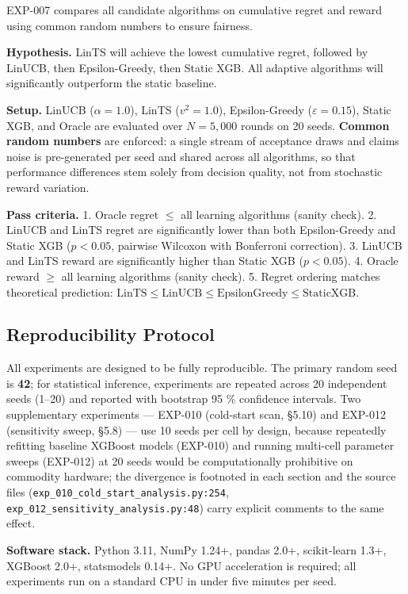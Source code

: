 EXP-007 compares all candidate algorithms on cumulative regret and reward using common random numbers to ensure fairness.

\textbf{Hypothesis.} LinTS will achieve the lowest cumulative regret, followed by LinUCB, then Epsilon-Greedy, then Static XGB. All adaptive algorithms will significantly outperform the static baseline.

\textbf{Setup.} LinUCB (\(\alpha = 1.0\)), LinTS (\(v^2 = 1.0\)), Epsilon-Greedy (\(\varepsilon = 0.15\)), Static XGB, and Oracle are evaluated over \(N = 5,000\) rounds on 20 seeds. \textbf{Common random numbers} are enforced: a single stream of acceptance draws and claims noise is pre-generated per seed and shared across all algorithms, so that performance differences stem solely from decision quality, not from stochastic reward variation.

\textbf{Pass criteria.}
1. Oracle regret \(\le\) all learning algorithms (sanity check).
2. LinUCB and LinTS regret are significantly lower than both Epsilon-Greedy and Static XGB (\(p < 0.05\), pairwise Wilcoxon with Bonferroni correction).
3. LinUCB and LinTS reward are significantly higher than Static XGB (\(p < 0.05\)).
4. Oracle reward \(\ge\) all learning algorithms (sanity check).
5. Regret ordering matches theoretical prediction: \(\text{LinTS} \le \text{LinUCB} \le \text{EpsilonGreedy} \le \text{StaticXGB}\).

\subsection{Reproducibility Protocol}\label{reproducibility-protocol}

All experiments are designed to be fully reproducible. The primary random seed is \textbf{42}; for statistical inference, experiments are repeated across 20 independent seeds (1--20) and reported with bootstrap 95 \% confidence intervals. Two supplementary experiments --- EXP-010 (cold-start scan, §5.10) and EXP-012 (sensitivity sweep, §5.8) --- use 10 seeds per cell by design, because repeatedly refitting baseline XGBoost models (EXP-010) and running multi-cell parameter sweeps (EXP-012) at 20 seeds would be computationally prohibitive on commodity hardware; the divergence is footnoted in each section and the source files (\texttt{exp\_010\_cold\_start\_analysis.py:254}, \texttt{exp\_012\_sensitivity\_analysis.py:48}) carry explicit comments to the same effect.

\textbf{Software stack.} Python 3.11, NumPy 1.24+, pandas 2.0+, scikit-learn 1.3+, XGBoost 2.0+, statsmodels 0.14+. No GPU acceleration is required; all experiments run on a standard CPU in under five minutes per seed.


